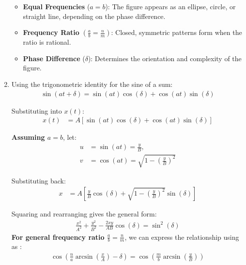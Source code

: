 \documentclass[report]{IEEEtran}
\begin{document}
\begin{enumerate}
\begin{itemize}
    \item \textbf{Equal Frequencies} (\( a = b \)): The figure appears as an ellipse, circle, or straight line, depending on the phase difference.
    
    \item \textbf{Frequency Ratio} \(\left( \frac{a}{b} = \frac{n}{m} \right)\): Closed, symmetric patterns form when the ratio is rational.
    
    \item \textbf{Phase Difference} (\( \delta \)): Determines the orientation and complexity of the figure. \\
\end{itemize}
    \item Using the trigonometric identity for the sine of a sum:
\begin{align*}
    \sin(a t + \delta) = \sin(a t) \cos(\delta) + \cos(a t) \sin(\delta)
\end{align*}

Substituting into $x(t)$:
\begin{align*}
    x(t) &= A [\sin(a t) \cos(\delta) + \cos(a t) \sin(\delta)]
\end{align*}

\textbf{Assuming $a = b$}, let:
\begin{align*}
    u &= \sin(a t) = \frac{y}{B}, \\
    v &= \cos(a t) = \sqrt{1 - \left(\frac{y}{B}\right)^2}
\end{align*}

Substituting back:
\begin{align*}
    x &= A \left[\frac{y}{B} \cos(\delta) + \sqrt{1 - \left(\frac{y}{B}\right)^2} \sin(\delta)\right]
\end{align*}

Squaring and rearranging gives the general form:
\begin{align*}
    \frac{x^2}{A^2} + \frac{y^2}{B^2} - \frac{2xy}{AB} \cos(\delta) = \sin^2(\delta)
\end{align*}
\textbf{For general frequency ratio \( \frac{a}{b} = \frac{n}{m} \)}, we can express the relationship using as : \\
\begin{align*}
    \cos\left(\frac{n}{a} \arcsin\left(\frac{x}{A}\right) - \delta\right) = \cos\left(\frac{m}{b} \arcsin\left(\frac{y}{B}\right)\right)
\end{align*}
\end{enumerate}
\end{document}
